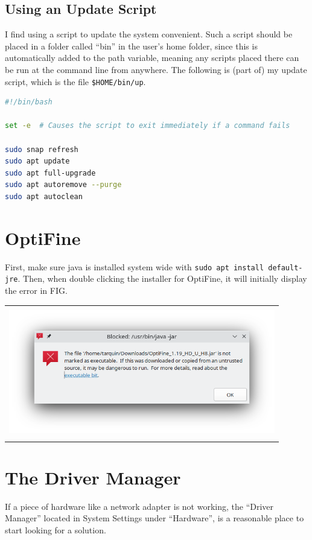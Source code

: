 \documentclass[a4paper, 12pt]{article}
\newenvironment{boxfig}
    {\begin{center}
    \begin{tabular}{|p{0.9\linewidth}|}
    \hline\\
    }
    {
    \\\\\hline
    \end{tabular}
    \end{center}
    }
\begin{document}
\subsection{Using an Update Script}
I find using a script to update the system convenient. Such a script should be placed in a folder called ``bin'' in the user's home folder, since this is automatically added to the path variable, meaning any scripts placed there can be run at the command line from anywhere. The following is (part of) my update script, which is the file \texttt{\$HOME/bin/up}.

\begin{lstlisting}[language=Bash]
#!/bin/bash

set -e  # Causes the script to exit immediately if a command fails

sudo snap refresh
sudo apt update
sudo apt full-upgrade
sudo apt autoremove --purge
sudo apt autoclean

\end{lstlisting}

\section{OptiFine}

First, make sure java is installed system wide with \texttt{sudo apt install default-jre}. Then, when double clicking the installer for OptiFine, it will initially display the error in FIG.

\begin{boxfig}
 \includegraphics[width=\linewidth]{images/optifine}
 \captionof{figure}{OptiFine}
\end{boxfig}

\section{The Driver Manager}

If a piece of hardware like a network adapter is not working, the ``Driver Manager'' located in System Settings under ``Hardware'', is a reasonable place to start looking for a solution.
\end{document}
